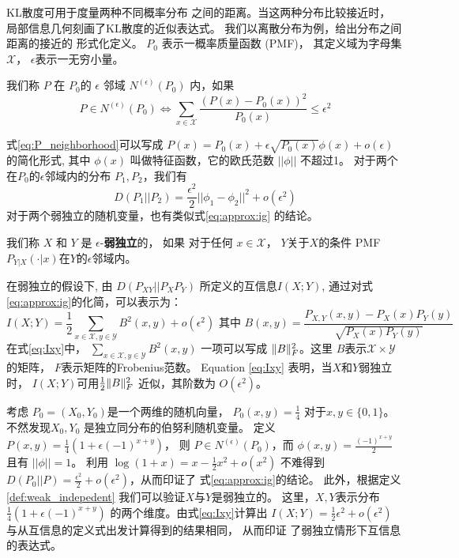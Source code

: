 KL散度可用于度量两种不同概率分布
之间的距离。当这两种分布比较接近时，
局部信息几何刻画了KL散度的近似表达式。
我们以离散分布为例，给出分布之间距离的接近的
形式化定义。
$P_0$ 表示一概率质量函数 (PMF)，
其定义域为字母集$\mathcal{X}$，
$\epsilon$表示一无穷小量。
\begin{definition}\label{def:eps_neighborhood}
我们称 $P$ 在 $P_0$的 $\epsilon$ 邻域 $N^{(\epsilon)}(P_0)$ 内，如果
\begin{equation}\label{eq:P_neighborhood}
P \in N^{(\epsilon)}(P_0) \iff
\sum_{x \in \mathcal{X}} \frac{(P(x) - P_0(x))^2}{P_0(x)} \leq \epsilon^2
\end{equation}
\end{definition}
式\eqref{eq:P_neighborhood}可以写成 $P(x) = P_0(x) + \epsilon
\sqrt{P_0(x)} \phi(x) + o(\epsilon)$的简化形式, 其中 $\phi(x)$
叫做特征函数，它的欧氏范数 $||\phi || $ 不超过1。
对于两个在$P_0$的$\epsilon$邻域内的分布 $P_1, P_2$，我们有
\begin{equation}\label{eq:approx:ig}
D(P_1 || P_2) = \frac{\epsilon^2}{2} ||\phi_1 - \phi_2||^2 + o(\epsilon^2)
\end{equation}
对于两个弱独立的随机变量，也有类似式\ref{eq:approx:ig}
的结论。
\begin{definition}\label{def:weak_indepedent}
我们称 $X$ 和 $Y$ 是 $\epsilon$-\textbf{弱独立}的，
如果 对于任何 $x \in \mathcal{X}$，
$Y$关于$X$的条件 PMF 
$P_{Y|X}(\cdot |x)$在$Y$的$\epsilon$邻域内。
\end{definition}
在弱独立的假设下, 由 $D(P_{XY}||P_XP_Y)$ 所定义的互信息$I(X;Y)$, 
通过对式\eqref{eq:approx:ig}的化简，可以表示为：
\begin{equation}\label{eq:Ixy}
I(X;Y) = \frac{1}{2}\sum_{x\in \mathcal{X}, y\in \mathcal{Y}} B^2(x,y) + o(\epsilon^2)
\textrm{ 其中 }  B(x,y)=\frac{P_{X,Y}(x,y) - P_X(x) P_Y(y)}{\sqrt{P_X(x)P_Y(y)}}
\end{equation}
在式\eqref{eq:Ixy}中， $\sum_{x\in \mathcal{X}, y\in \mathcal{Y}} B^2(x,y)$
一项可以写成 $\lVert B\rVert_F^2$。这里 $B$表示$\mathcal{X} \times \mathcal{Y}$的矩阵，
$F$表示矩阵的Frobenius范数。
Equation \eqref{eq:Ixy} 表明，当$X$和$Y$弱独立时，
$I(X;Y)$可用$\frac{1}{2} \lVert B\rVert_F^2$
近似，其阶数为 $O(\epsilon^2)$。

\begin{example}\label{ex:Pweak_1}
考虑 $P_0=(X_0,Y_0)$是一个两维的随机向量，
$P_0(x,y)=\frac{1}{4}$ 对于$x,y \in \{0,1\}$。
不然发现$X_0,Y_0$
是独立同分布的伯努利随机变量。
定义 $P(x,y)=\frac{1}{4}(1+\epsilon (-1)^{x+y})$，
则 $P\in N^{(\epsilon)}(P_0)$，而
$\phi(x,y) = \frac{(-1)^{x+y}}{2}$
且有 $||\phi||=1$。
利用 $\log(1+x) = x - \frac{1}{2}x^2 + o(x^2)$
不难得到 $D(P_0||P)=\frac{\epsilon^2}{2}
+o(\epsilon^2)$，从而印证了
式\eqref{eq:approx:ig}的结论。
此外，根据定义\ref{def:weak_indepedent}
我们可以验证$X$与$Y$是弱独立的。
这里，$X,Y$表示分布$\frac{1}{4}(1+\epsilon (-1)^{x+y})$
的两个维度。由式\eqref{eq:Ixy}计算出
$I(X;Y)=\frac{1}{2}\epsilon^2+o(\epsilon^2)$
与从互信息的定义式出发计算得到的结果相同，
从而印证
了弱独立情形下互信息的表达式。
\end{example}
     
